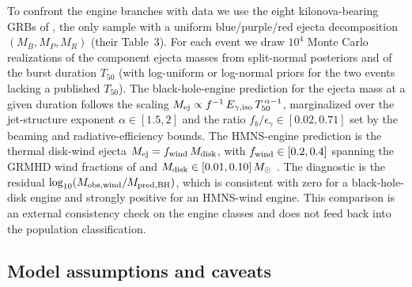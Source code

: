 \documentclass[twocolumn,amsmath]{aastex702}
\newcommand{\Msun}{M_\odot}
\newcommand{\Mdisk}{M_{\rm disk}}
\begin{document}
To confront the engine branches with data we use the eight kilonova-bearing GRBs
of \citet{rastinejad2024}, the only sample with a uniform blue/purple/red
ejecta decomposition $(M_B, M_P, M_R)$ (their Table~3). For each event we draw
$10^4$ Monte Carlo realizations of the component ejecta masses from split-normal
posteriors and of the burst duration $T_{50}$ (with log-uniform or log-normal
priors for the two events lacking a published $T_{50}$). The black-hole-engine
prediction for the ejecta mass at a given duration follows the
\citet[their Eqs.~10 and 11]{gottlieb2024} scaling
$M_{\rm ej} \propto f^{-1}\,E_{\gamma,\rm iso}\,T_{50}^{\,\alpha-1}$, marginalized
over the jet-structure exponent $\alpha \in [1.5, 2]$ and the ratio
$f_b/\epsilon_\gamma \in [0.02, 0.71]$ set by the \citet{berger2014} beaming
and \citet{beniamini2016} radiative-efficiency bounds. The HMNS-engine
prediction is the thermal disk-wind ejecta $M_{\rm ej} = f_{\rm wind}\,\Mdisk$,
with $f_{\rm wind} \in [0.2, 0.4]$ spanning the GRMHD wind fractions of
\citet{radice2018} and $\Mdisk \in [0.01, 0.10]\,\Msun$
\citep[their Sec.~3.1]{gottlieb2024}. The diagnostic is the residual
$\log_{10}(M_{\rm obs,wind}/M_{\rm pred,BH})$, which is consistent with zero for a
black-hole-disk engine and strongly positive for an HMNS-wind engine. This
comparison is an external consistency check on the engine classes and does not
feed back into the population classification.

\subsection{Model assumptions and caveats} \label{sec:assumptions}
\end{document}
